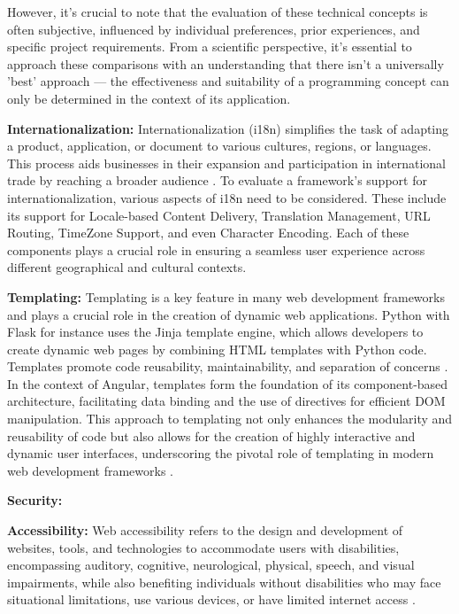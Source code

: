 However, it's crucial to note that the evaluation of these technical concepts is often subjective, influenced by individual preferences, prior experiences, and specific project requirements. From a scientific perspective, it's essential to approach these comparisons with an understanding that there isn't a universally 'best' approach — the effectiveness and suitability of a programming concept can only be determined in the context of its application.

\textbf{Internationalization:}
Internationalization (i18n) simplifies the task of adapting a product, application, or document to various cultures, regions, or languages. This process aids businesses in their expansion and participation in international trade by reaching a broader audience \cite{DelSalasZarate.2015}. To evaluate a framework's support for internationalization, various aspects of i18n need to be considered. These include its support for Locale-based Content Delivery, Translation Management, URL Routing, TimeZone Support, and even Character Encoding. Each of these components plays a crucial role in ensuring a seamless user experience across different geographical and cultural contexts.


\textbf{Templating:}
Templating is a key feature in many web development frameworks and plays a crucial role in the creation of dynamic web applications. Python with Flask for instance uses the Jinja template engine, which allows developers to create dynamic web pages by combining HTML templates with Python code. Templates promote code reusability, maintainability, and separation of concerns \cite{Vyshnavi.2019}. 
In the context of Angular, templates form the foundation of its component-based architecture, facilitating data binding and the use of directives for efficient DOM manipulation. This approach to templating not only enhances the modularity and reusability of code but also allows for the creation of highly interactive and dynamic user interfaces, underscoring the pivotal role of templating in modern web development frameworks \cite{Angular.2023}.




\textbf{Security:}






\textbf{Accessibility:}
Web accessibility refers to the design and development of websites, tools, and technologies to accommodate users with disabilities, encompassing auditory, cognitive, neurological, physical, speech, and visual impairments, while also benefiting individuals without disabilities who may face situational limitations, use various devices, or have limited internet access \cite{W3C.2022}.


